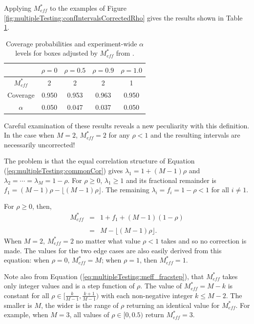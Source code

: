 \documentclass[letterpaper,12pt,oneside,final]{article}
\begin{document}
Applying  $M^*_{eff}$ to the examples of Figure \ref{fig:multipleTesting:confIntervalsCorrectedRho} gives the results shown in Table \ref{tab:multipleTesting:coverageMfrac}.
\begin{table}[htp]
\begin{center}
\begin{tabular}{c|cccc}
& 
$\rho = 0$ &
$\rho = 0.5$ &
$\rho = 0.9$ &
$\rho = 1.0$ \\
\hline
$M_{eff}^*$ & 
2 &
2 &
2 &
1
\\
Coverage  &
0.950 &
0.953 &
0.963  &
0.950 
\\
$\alpha$  &
0.050 &
0.047 &
0.037 &
0.050
\end{tabular}
\end{center}
\caption{Coverage probabilities and experiment-wide $\alpha$ levels for boxes adjusted by $M_{eff}^*$ from \cite{LiJi2005}.}
\label{tab:multipleTesting:coverageMfrac}
\end{table}
Careful examination of these results reveals a new peculiarity with this definition. In the case when $M=2$, $M_{eff}^* = 2$ for any $\rho < 1$ and the resulting intervals are necessarily uncorrected!

The problem is that the equal correlation structure of Equation (\ref{eq:multipleTesting:commonCor}) gives $\lambda_1 = 1 + (M-1)\rho$ and $\lambda_2 = \cdots = \lambda_M = 1- \rho$. For $\rho \ge 0$, $\lambda_1 \ge 1$ and its fractional remainder is $f_1 = (M-1)\rho - \lfloor (M-1)\rho \rfloor$. The remaining $\lambda_i  = f_i = 1 - \rho < 1$ for all $i \ne 1$.

For  $\rho \ge 0$, then, 
\begin{eqnarray}
M_{eff}^* &=&  1 + f_1+ (M-1)(1-\rho) 
\nonumber \\
&& \nonumber \\
&=& M - \lfloor (M-1) \rho \rfloor.
\label{eq:multipleTesting:meff_fracstep}
\end{eqnarray}
When $M=2$, $M_{eff}^* = 2$ no matter what value $\rho < 1$ takes and so no correction is made. The values for the two edge cases are also easily derived from this equation: when $\rho =0$, $M_{eff}^*= M$; when $\rho =1$, then $M_{eff}^*=1$. 

Note also from Equation (\ref{eq:multipleTesting:meff_fracstep}), that $M_{eff}^*$ takes only integer values and is a step function of $\rho$. The value of $M_{eff}^* = M- k$ is constant for all $\rho \in [\frac{k}{M-1},  \frac{k+1}{M-1} )$ with each non-negative integer $k \le M-2$.  The smaller is $M$, the wider is the range of $\rho$ returning an identical value for $M_{eff}^*$.  For example, when $M=3$, all values of $\rho \in [0, 0.5) $ return  $M_{eff}^* = 3$.
\end{document}
